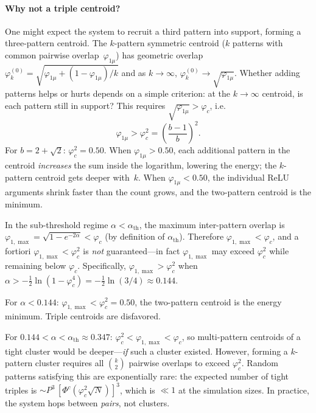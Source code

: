 \documentclass[11pt]{article}
\begin{document}
\paragraph{Why not a triple centroid?}
One might expect the system to recruit a third pattern into support, forming a three-pattern centroid.  The $k$-pattern symmetric centroid ($k$ patterns with common pairwise overlap~$\varphi_{1\mu}$) has geometric overlap $\varphi_k^{(0)} = \sqrt{\varphi_{1\mu} + (1-\varphi_{1\mu})/k}$ and as $k\to\infty$, $\varphi_k^{(0)} \to \sqrt{\varphi_{1\mu}}$.  Whether adding patterns helps or hurts depends on a simple criterion: at the $k\to\infty$ centroid, is each pattern still in support?  This requires $\sqrt{\varphi_{1\mu}} > \varphi_c$, i.e.
\begin{equation}
\varphi_{1\mu} > \varphi_c^2 = \left(\frac{b-1}{b}\right)^{\!2}.
\label{eq:cluster_criterion}
\end{equation}
For $b = 2\!+\!\sqrt{2}$: $\varphi_c^2 = 0.50$.  When $\varphi_{1\mu} > 0.50$, each additional pattern in the centroid \emph{increases} the sum inside the logarithm, lowering the energy; the $k$-pattern centroid gets deeper with~$k$.  When $\varphi_{1\mu} < 0.50$, the individual ReLU arguments shrink faster than the count grows, and the two-pattern centroid is the minimum.

In the sub-threshold regime $\alpha < \alpha_{\mathrm{th}}$, the maximum inter-pattern overlap is $\varphi_{1,\max} = \sqrt{1-e^{-2\alpha}} < \varphi_c$ (by definition of $\alpha_{\mathrm{th}}$).  Therefore $\varphi_{1,\max} < \varphi_c$, and a fortiori $\varphi_{1,\max} < \varphi_c^2$ is \emph{not} guaranteed---in fact $\varphi_{1,\max}$ may exceed $\varphi_c^2$ while remaining below $\varphi_c$.  Specifically, $\varphi_{1,\max} > \varphi_c^2$ when $\alpha > -\tfrac{1}{2}\ln(1-\varphi_c^4) = -\tfrac{1}{2}\ln(3/4) \approx 0.144$.

For $\alpha < 0.144$: $\varphi_{1,\max} < \varphi_c^2 = 0.50$, the two-pattern centroid is the energy minimum.  Triple centroids are disfavored.

For $0.144 < \alpha < \alpha_{\mathrm{th}} \approx 0.347$: $\varphi_c^2 < \varphi_{1,\max} < \varphi_c$, so multi-pattern centroids of a tight cluster would be deeper---\emph{if} such a cluster existed.  However, forming a $k$-pattern cluster requires all $\binom{k}{2}$ pairwise overlaps to exceed $\varphi_c^2$.  Random patterns satisfying this are exponentially rare: the expected number of tight triples is $\sim P^3\,[\Phi^c(\varphi_c^2\sqrt{N})]^3$, which is $\ll 1$ at the simulation sizes.  In practice, the system hops between \emph{pairs}, not clusters.
\end{document}

